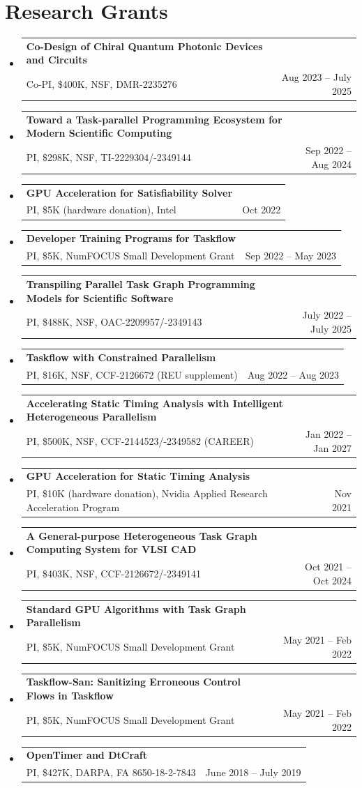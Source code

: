 \documentclass[A4,11pt]{article}
\makeatletter
\newcommand{\CVItem}[1]{
  \item\small{
    {#1 \vspace{-2pt}}
  }
}
\newcommand{\CVSubheading}[4]{
  \vspace{-2pt}\item
    \begin{tabular*}{0.97\textwidth}[t]{l@{\extracolsep{\fill}}r}
      \textbf{#1} & #2 \\
      \small#3 & \small #4 \\
    \end{tabular*}\vspace{-7pt}
}
\newcommand{\CVSubHeadingListStart}{\begin{itemize}[leftmargin=0.5cm, label={}]}
\newcommand{\CVSubHeadingListEnd}{\end{itemize}}
\newcommand{\CVItemListStart}{\begin{itemize}}
\newcommand{\CVItemListEnd}{\end{itemize}\vspace{-5pt}}
\makeatother
\begin{document}
\section{Research Grants}
  \CVSubHeadingListStart
    \CVSubheading
      {{Co-Design of Chiral Quantum Photonic Devices and Circuits}}{}
      {Co-PI, \$400K, NSF, DMR-2235276}{Aug 2023 -- July 2025}
    \CVSubheading
      {{Toward a Task-parallel Programming Ecosystem for Modern Scientific Computing}}{}
      {PI, \$298K, NSF, TI-2229304/-2349144}{Sep 2022 -- Aug 2024}
    \CVSubheading
      {{GPU Acceleration for Satisfiability Solver}}{}
      {PI, \$5K (hardware donation), Intel}{Oct 2022}
    \CVSubheading
      {{Developer Training Programs for Taskflow}}{}
      {PI, \$5K, NumFOCUS Small Development Grant}{Sep 2022 -- May 2023}
    \CVSubheading
      {{Transpiling Parallel Task Graph Programming Models for Scientific Software}}{}
      {PI, \$488K, NSF, OAC-2209957/-2349143}{July 2022 -- July 2025}
    \CVSubheading
      {{Taskflow with Constrained Parallelism}}{}
      {PI, \$16K, NSF, CCF-2126672 (REU supplement)}{Aug 2022 -- Aug 2023}
    \CVSubheading
      {{Accelerating Static Timing Analysis with Intelligent Heterogeneous Parallelism}}{}
      {PI, \$500K, NSF, CCF-2144523/-2349582 (CAREER)}{Jan 2022 -- Jan 2027}
    \CVSubheading
      {{GPU Acceleration for Static Timing Analysis}}{}
      {PI, \$10K (hardware donation), Nvidia Applied Research Acceleration Program}{Nov 2021}
    \CVSubheading
      {{A General-purpose Heterogeneous Task Graph Computing System for VLSI CAD}}{}
      {PI, \$403K, NSF, CCF-2126672/-2349141}{Oct 2021 -- Oct 2024}
    \CVSubheading
      {{Standard GPU Algorithms with Task Graph Parallelism}}{}
      {PI, \$5K, NumFOCUS Small Development Grant}{May 2021 -- Feb 2022}
    \CVSubheading
      {{Taskflow-San: Sanitizing Erroneous Control Flows in Taskflow}}{}
      {PI, \$5K, NumFOCUS Small Development Grant}{May 2021 -- Feb 2022}
    \CVSubheading
      {{OpenTimer and DtCraft}}{}
      {PI, \$427K, DARPA, FA 8650-18-2-7843}{June 2018 -- July 2019}
  \CVSubHeadingListEnd

\end{document}
